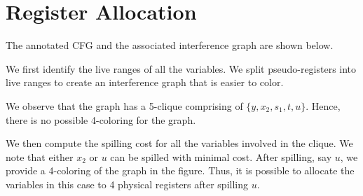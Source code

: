 \section{Register Allocation}

The annotated CFG and the associated interference graph are shown below. 

We first identify the live ranges of all the variables. We split
pseudo-registers into live ranges to create an interference graph that
is easier to color.

We observe that the graph has a 5-clique comprising of $\{y, x_2, s_1, t, u \}$.
Hence, there is no possible 4-coloring for the graph.

We then compute the spilling cost for all the variables involved in the clique.
We note that either $x_2$ or $u$ can be spilled with minimal cost.
After spilling, say $u$, we provide a 4-coloring of the graph in the figure.
Thus, it is possible to allocate the variables in this case to 4 physical
registers after spilling $u$.



